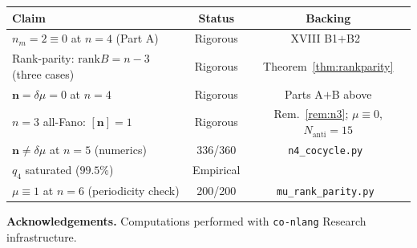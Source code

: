 \documentclass[11pt,a4paper]{article}
\theoremstyle{remark}
\newcommand{\rank}{\mathrm{rank}}
\newcommand{\Nanti}{N_{\mathrm{anti}}}
\begin{document}
\begin{center}
\begin{tabular}{p{5.8cm}cc}
\toprule
Claim & Status & Backing \\
\midrule
$n_m=2\equiv0$ at $n=4$ (Part A) & Rigorous &
  XVIII B1$+$B2~\cite{PaperXVIII} \\
Rank-parity: $\rank B=n-3$ (three cases) & Rigorous &
  Theorem~\ref{thm:rankparity} \\
$\mathbf{n}=\delta\mu=0$ at $n=4$ & Rigorous &
  Parts A$+$B above \\
$n=3$ all-Fano: $[\mathbf{n}]=1$ & Rigorous &
  Rem.~\ref{rem:n3}; $\mu\equiv0$, $\Nanti=15$ \\
$\mathbf{n}\ne\delta\mu$ at $n=5$ (numerics) & 336/360 &
  \texttt{n4\_cocycle.py}~\cite{PaperXXsuppl} \\
$q_4$ saturated ($99.5\%$) & Empirical &
  \cite{PaperXIX,PaperXXsuppl} \\
$\mu\equiv1$ at $n=6$ (periodicity check) & 200/200 &
  \texttt{mu\_rank\_parity.py}~\cite{PaperXXsuppl} \\
\bottomrule
\end{tabular}
\end{center}

\bigskip
\noindent\textbf{Acknowledgements.}
Computations performed with \texttt{co-nlang} Research infrastructure.
\end{document}
